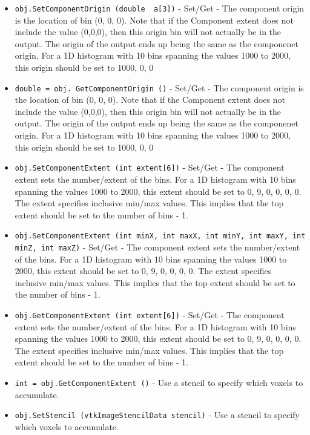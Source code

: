 \begin{itemize}
\item  \verb|obj.SetComponentOrigin (double  a[3])| -  Set/Get - The component origin is the location of bin (0, 0, 0).
 Note that if the Component extent does not include the value (0,0,0),
 then this origin bin will not actually be in the output.
 The origin of the output ends up being the same as the componenet origin.
 For a 1D histogram with 10 bins spanning the values 1000 to 2000,
 this origin should be set to 1000, 0, 0

\item  \verb|double = obj. GetComponentOrigin ()| -  Set/Get - The component origin is the location of bin (0, 0, 0).
 Note that if the Component extent does not include the value (0,0,0),
 then this origin bin will not actually be in the output.
 The origin of the output ends up being the same as the componenet origin.
 For a 1D histogram with 10 bins spanning the values 1000 to 2000,
 this origin should be set to 1000, 0, 0

\item  \verb|obj.SetComponentExtent (int extent[6])| -  Set/Get - The component extent sets the number/extent of the bins.
 For a 1D histogram with 10 bins spanning the values 1000 to 2000,
 this extent should be set to 0, 9, 0, 0, 0, 0.
 The extent specifies inclusive min/max values.
 This implies that the top extent should be set to the number of bins - 1.

\item  \verb|obj.SetComponentExtent (int minX, int maxX, int minY, int maxY, int minZ, int maxZ)| -  Set/Get - The component extent sets the number/extent of the bins.
 For a 1D histogram with 10 bins spanning the values 1000 to 2000,
 this extent should be set to 0, 9, 0, 0, 0, 0.
 The extent specifies inclusive min/max values.
 This implies that the top extent should be set to the number of bins - 1.

\item  \verb|obj.GetComponentExtent (int extent[6])| -  Set/Get - The component extent sets the number/extent of the bins.
 For a 1D histogram with 10 bins spanning the values 1000 to 2000,
 this extent should be set to 0, 9, 0, 0, 0, 0.
 The extent specifies inclusive min/max values.
 This implies that the top extent should be set to the number of bins - 1.

\item  \verb|int = obj.GetComponentExtent ()| -  Use a stencil to specify which voxels to accumulate.

\item  \verb|obj.SetStencil (vtkImageStencilData stencil)| -  Use a stencil to specify which voxels to accumulate.


\end{itemize}
